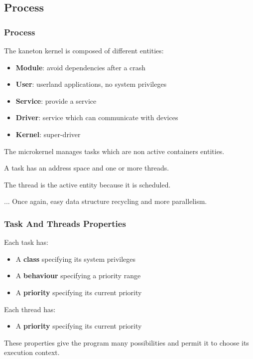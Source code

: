 \documentclass[8pt]{beamer}
\newcommand{\nl}[0]{\vspace{0.4cm}}
\begin{document}
%
%

\subsection{Process}


\begin{frame}
  \frametitle{Process}

  The kaneton kernel is composed of different entities:

  \begin{itemize}[<+->]
    \item
      \textbf{Module}: avoid dependencies after a crash
    \item
      \textbf{User}: userland applications, no system privileges
    \item
      \textbf{Service}: provide a service
    \item
      \textbf{Driver}: service which can communicate with devices
    \item
      \textbf{Kernel}: super-driver
  \end{itemize}

  \nl

  The microkernel manages tasks which are non active containers
  entities.

  \nl

  A task has an address space and one or more threads.

  \nl

  The thread is the active entity because it is scheduled.

  \nl

  ... Once again, easy data structure recycling and more parallelism.
\end{frame}


\begin{frame}
  \frametitle{Task And Threads Properties}

  Each task has:

  \begin{itemize}[<+->]
    \item
      A \textbf{class} specifying its system privileges
    \item
      A \textbf{behaviour} specifying a priority range
    \item
      A \textbf{priority} specifying its current priority
  \end{itemize}

  \nl

  Each thread has:

  \begin{itemize}[<+->]
    \item
      A \textbf{priority} specifying its current priority
  \end{itemize}

  \nl

  These properties give the program many possibilities and
  permit it to choose its execution context.
\end{frame}
\end{document}
